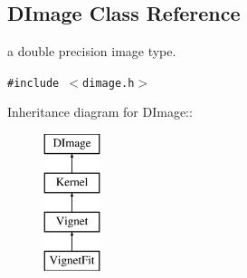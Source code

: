 \subsection{DImage  Class Reference}
\label{class_dimage}
a double precision image type. 


{\tt \#include $<$dimage.h$>$}

Inheritance diagram for DImage::\begin{figure}[H]
\begin{center}
\leavevmode
\includegraphics[height=4cm]{class_dimage}
\end{center}
\end{figure}
